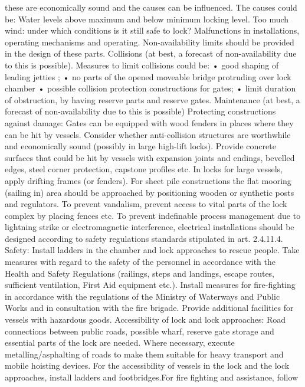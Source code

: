 these are economically sound and the causes can be influenced.
The causes could be:
Water levels above maximum and below minimum locking level.
Too much wind: under which conditions is it still safe to lock?
Malfunctions in installations, operating mechanisms and operating.
Non-availability limits should be provided in the design of these
parts.
Collisions (at best, a forecast of non-availability due to this is
possible). Measures to limit collisions could be:
• good shaping of leading jetties ;
• no parts of the opened moveable bridge protruding over lock
chamber
• possible collision protection constructions for gates;
• limit duration of obstruction, by having reserve parts and reserve
gates.
Maintenance (at best, a forecast of non-availability due to this is
possible)
Protecting constructions against damage:
Gates can be equipped with wood fenders in places where they can
be hit by vessels.
Consider whether anti-collision structures are worthwhile and
economically sound (possibly in large high-lift locks).
Provide concrete surfaces that could be hit by vessels with expansion
joints and endings, bevelled edges, steel corner protection,
capstone profiles etc.
In locks for large vessels, apply drifting frames (or fenders).
For sheet pile constructions the flat mooring (sailing in) area should
be approached by positioning wooden or synthetic posts and regulators.
To prevent vandalism, prevent access to vital parts of the lock complex
by placing fences etc.
To prevent indefinable process management due to lightning strike
or electromagnetic interference, electrical installations should be
designed according to safety regulations standards stipulated in art.
2.4.11.4.
Safety:
Install ladders in the chamber and lock approaches to rescue
people.
Take measures with regard to the safety of the personnel in accordance
with the Health and Safety Regulations (railings, steps and
landings, escape routes, sufficient ventilation, First Aid equipment
etc.).
Install measures for fire-fighting in accordance with the regulations
of the Ministry of Waterways and Public Works and in consultation
with the fire brigade. Provide additional facilities for vessels with
hazardous goods.
Accessibility of lock and lock approaches:
Road connections between public roads, possible wharf, reserve
gate storage and essential parts of the lock are needed. Where
necessary, execute metalling/asphalting of roads to make them suitable
for heavy transport and mobile hoisting devices.
For the accessibility of vessels in the lock and the lock approaches,
install ladders and footbridges.For fire fighting and assistance, follow
